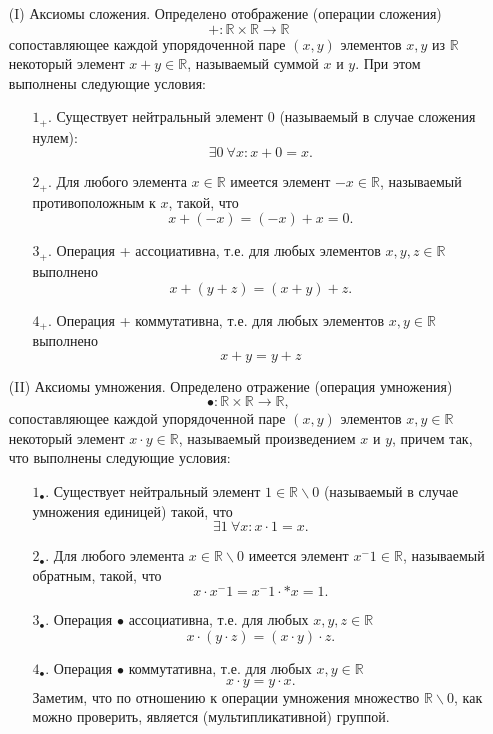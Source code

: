 \documentclass[a4paper, 12pt]{article} %
\begin{document}
\begin{enumerate}
    \item [(I)] Аксиомы сложения. Определено отображение (операции сложения)
          $$ + : \mathbb{R} \times \mathbb{R} \to \mathbb{R} $$
          сопоставляющее каждой упорядоченной паре $(x, y)$ элементов $x, y$ из $\mathbb{R}$ некоторый элемент $x+y \in \mathbb{R}$, называемый суммой $x$ и $y$. При этом выполнены следующие условия:
          \begin{enumerate}
              \item [$1_+.$] Существует нейтральный элемент 0 (называемый в случае сложения нулем):
                    $$ \exists 0 \ \forall x: x + 0 = x. $$
              \item [$2_+.$] Для любого элемента $x \in \mathbb{R}$ имеется элемент $-x \in \mathbb{R}$, называемый противоположным к $x$, такой, что
                    $$ x + (-x) = (-x) + x = 0. $$
              \item [$3_+.$] Операция + ассоциативна, т.е. для любых элементов $x, y, z \in \mathbb{R}$ выполнено $$ x + (y + z) = (x + y) + z. $$
              \item [$4_+.$] Операция + коммутативна, т.е. для любых элементов $x, y \in \mathbb{R}$ выполнено $$ x + y = y + z $$
          \end{enumerate}
    \item [(II)] Аксиомы умножения. Определено отражение (операция умножения) $$ \bullet : \mathbb{R} \times \mathbb{R} \to \mathbb{R}, $$ сопоставляющее каждой упорядоченной паре $(x, y)$ элементов $x, y \in \mathbb{R}$ некоторый элемент $x \cdot y \in \mathbb{R}$, называемый произведением $x$ и $y$, причем так, что выполнены следующие условия:
          \begin{enumerate}
              \item [$1_\bullet.$] Существует нейтральный элемент $1 \in \mathbb{R} \backslash 0$ (называемый в случае умножения единицей) такой, что $$ \exists 1 \ \forall x: x \cdot 1 = x.$$
              \item [$2_\bullet.$] Для любого элемента $x \in \mathbb{R} \backslash 0$ имеется элемент $x^-1 \in \mathbb{R}$, называемый обратным, такой, что $$ x \cdot x^-1 = x^-1 \cdot * x = 1.$$
              \item [$3_\bullet.$] Операция $\bullet$ ассоциативна, т.е. для любых $x, y, z \in \mathbb{R}$ $$ x \cdot (y \cdot z) = (x \cdot y) \cdot z.$$
              \item [$4_\bullet.$] Операция $\bullet$ коммутативна, т.е. для любых $x, y \in \mathbb{R}$ $$ x \cdot y = y \cdot x.$$
                    Заметим, что по отношению к операции умножения множество $\mathbb{R} \backslash 0$, как можно проверить, является (мультипликативной) группой.
          \end{enumerate}
\end{enumerate}
\end{document}

